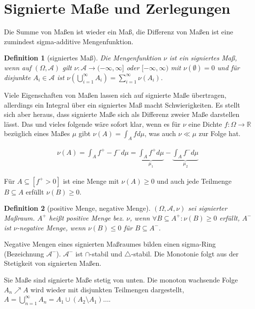 \documentclass[]{article}
\newtheorem{definition}{Definition}
\begin{document}
\section{Signierte Maße und Zerlegungen}

Die Summe von Maßen ist wieder ein Maß, die Differenz von Maßen ist eine zumindest sigma-additive Mengenfunktion.

\begin{definition}[signiertes Maß]
	Die Mengenfunktion $\nu$ ist ein signiertes Maß, wenn auf $(\Omega, \mathcal{A})$ gilt $\nu:\mathcal{A} \rightarrow (-\infty, \infty]$ oder $[-\infty, \infty)$ mit $\nu(\emptyset) = 0$ und für disjunkte $A_i \in \mathcal{A}$ ist $\nu(\bigcup_{i=1}^{\infty}A_i) = \sum_{i=1}^{\infty}\nu(A_i)$.
\end{definition}

Viele Eigenschaften von Maßen lassen sich auf signierte Maße übertragen, allerdings ein Integral über ein signiertes Maß macht Schwierigkeiten.
Es stellt sich aber heraus, dass signierte Maße sich als Differenz zweier Maße darstellen lässt. Das und vieles folgende wäre sofort klar, wenn es für $\nu$ eine Dichte $f:\Omega\rightarrow\mathbb{R}$ bezüglich eines Maßes $\mu$ gibt $\nu(A) = \int_A f d\mu$, was auch $\nu \ll \mu$ zur Folge hat.

\begin{align*}
	\nu(A) = \int_A f^+ - f^- d\mu = \underbrace{\int_A f^+ d\mu}_{\mu_1} - \underbrace{\int_A f^- d\mu}_{\mu_2}
\end{align*}

Für $A \subseteq [f^+>0]$ ist eine Menge mit $\nu(A)\geq 0$ und auch jede Teilmenge $B \subseteq A$ erfüllt $\nu(B)\geq 0$.

\begin{definition}[positive Menge, negative Menge]
	$(\Omega, \mathcal{A}, \nu)$ sei signierter Maßraum. $A^+$ heißt positive Menge bez. $\nu$, wenn $\forall B \subseteq A^+: \nu(B)\geq 0$ erfüllt, $A^-$ ist $\nu$-negative Menge, wenn $\nu(B)\leq 0$ für $B \subseteq A^-$.
\end{definition}

Negative Mengen eines signierten Maßraumes bilden einen sigma-Ring (Bezeichnung $\mathcal{A}^-$). $\mathcal{A}^-$ ist $\cap$-stabil und $\triangle$-stabil. Die Monotonie folgt aus der Stetigkeit von signierten Maßen.

Sie Maße sind signierte Maße stetig von unten. Die monoton wachsende Folge $A_n\nearrow A$ wird wieder mit disjunkten Teilmengen dargestellt, $A = \bigcup_{n=1}^{\infty}A_n = A_1 \cup (A_2\setminus A_1) \dots$.
\end{document}
